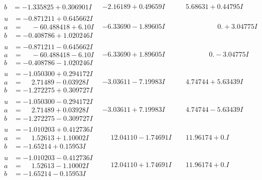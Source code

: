 \documentclass[1p]{elsarticle_modified}
\theoremstyle{definition}
\begin{document}
$$\begin{array}{c|c|c}
\begin{aligned}
b &= -1.335825 + 0.306901 I\end{aligned}
 & -2.16189 + 0.49659 I & \phantom{-}5.68631 + 0.44795 I \\ \hline\begin{aligned}
u &= -0.871211 + 0.645662 I \\
a &= \phantom{-}                -6
0.488418 + 6. 10   I \\
b &= -0.408786 + 1.020246 I\end{aligned}
 & -6.33690 - 1.89605 I & \phantom{-0.000000 -}0. + 3.04775 I \\ \hline\begin{aligned}
u &= -0.871211 - 0.645662 I \\
a &= \phantom{-}                -6
0.488418 - 6. 10   I \\
b &= -0.408786 - 1.020246 I\end{aligned}
 & -6.33690 + 1.89605 I & \phantom{-0.000000 } 0. - 3.04775 I \\ \hline\begin{aligned}
u &= -1.050300 + 0.294172 I \\
a &= \phantom{-}2.71489 - 0.03928 I \\
b &= -1.272275 + 0.309727 I\end{aligned}
 & -3.03611 - 7.19983 I & \phantom{-}4.74744 + 5.63439 I \\ \hline\begin{aligned}
u &= -1.050300 - 0.294172 I \\
a &= \phantom{-}2.71489 + 0.03928 I \\
b &= -1.272275 - 0.309727 I\end{aligned}
 & -3.03611 + 7.19983 I & \phantom{-}4.74744 - 5.63439 I \\ \hline\begin{aligned}
u &= -1.010203 + 0.412736 I \\
a &= \phantom{-}1.52613 + 1.10002 I \\
b &= -1.65214 + 0.15953 I\end{aligned}
 & \phantom{-}12.04110 - 1.74691 I & \phantom{-}11.96174 + 0. I\phantom{ +0.000000I} \\ \hline\begin{aligned}
u &= -1.010203 - 0.412736 I \\
a &= \phantom{-}1.52613 - 1.10002 I \\
b &= -1.65214 - 0.15953 I\end{aligned}
 & \phantom{-}12.04110 + 1.74691 I & \phantom{-}11.96174 + 0. I\phantom{ +0.000000I} \\ \hline\begin{aligned}

\end{aligned}
\end{array}$$
\end{document}
